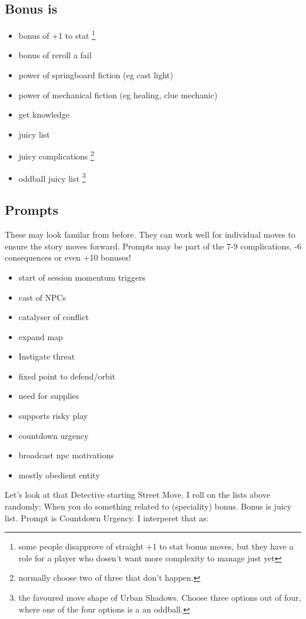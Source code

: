 \documentclass{tufte-handout}
\begin{document}
\subsection{Bonus is}
\begin{itemize}
\item bonus of +1 to stat  \footnote{some people disapprove of straight +1 to stat bonus moves, but they have a role for a player who dosen't want more complexity to manage just yet}
\item bonus of reroll a fail
\item power of springboard fiction (eg cast light)
\item power of mechanical fiction (eg healing, clue mechanic)
\item get knowledge 
\item juicy list
\item juicy complications \footnote{normally choose two of three that don't happen.}
\item oddball juicy list \footnote{the favoured move shape of Urban Shadows. Choose three options out of four, where one of the four options is a an oddball.}
\end{itemize}

\subsection{Prompts}
These may look familar from before. They can work well for individual moves to ensure the story moves forward. Prompts may be part of the 7-9 complications, -6 consequences or even +10 bonuses!
\begin{itemize}
\item start of session momentum triggers 
\item cast of NPCs 
\item catalyser of conflict 
\item expand map
\item Instigate threat
\item fixed point to defend/orbit
\item need for supplies
\item supports risky play
\item countdown urgency
\item broadcast npc motivations
\item mostly obedient entity
\end{itemize}

Let's look at that Detective starting Street Move. I roll on the lists above randomly:
When you do something related to (speciality) bonus. Bonus is juicy list. Prompt is Countdown Urgency. I interperet that as:
\end{document}
